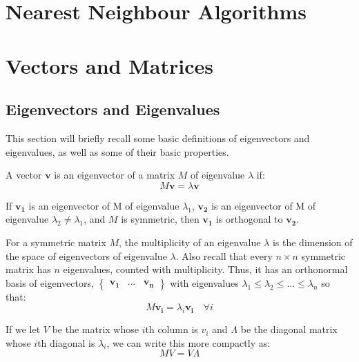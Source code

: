 \section{Nearest Neighbour Algorithms}
\label{sec:nearestNeighbourAlgorithms}

\section{Vectors and Matrices}
\label{sec:vectorsAndMatrices}

\subsection{Eigenvectors and Eigenvalues}
\label{sec:vectorsAndMatrices:eigenvectorsAndEigenvalues}
This section will briefly recall some basic definitions of eigenvectors and
eigenvalues, as well as some of their basic properties.

A vector $\mathbf{v}$ is an eigenvector of a matrix $M$ of eigenvalue $\lambda$ 
if:
\begin{displaymath}
M\mathbf{v} = \lambda\textbf{v}
\end{displaymath}

If $\mathbf{v_{1}}$ is an eigenvector of M of eigenvalue $\lambda_{1}$, 
$\mathbf{v_{2}}$ is an eigenvector of M of eigenvalue $\lambda_{2} \neq 
\lambda_{1}$, and $M$ is symmetric, then $\mathbf{v_{1}}$ is orthogonal to 
$\mathbf{v_{2}}$.

For a symmetric matrix $M$, the multiplicity of an eigenvalue $\lambda$ is the
dimension of the space of eigenvectors of eigenvalue $\lambda$. Also recall that
every $n{\times}n$ symmetric matrix has $n$ eigenvalues, counted with 
multiplicity. Thus, it has an orthonormal basis of eigenvectors, 
$\begin{Bmatrix} \mathbf{v_{1}} & \ldots & \mathbf{v_{n}} \end{Bmatrix}$ with
eigenvalues $\lambda_{1} \leq \lambda_{2} \leq \ldots \leq \lambda_{n}$ so that:
\begin{displaymath}
M\mathbf{v_{i}} = \lambda_{i}\mathbf{v_{i}} \quad \forall i
\end{displaymath}

If we let $V$ be the matrix whose $i$th column is $v_{i}$ and $\Lambda$ be the 
diagonal matrix whose $i$th diagonal is $\lambda_{i}$, we can write this more 
compactly as:
\begin{displaymath}
MV = V\Lambda
\end{displaymath}

